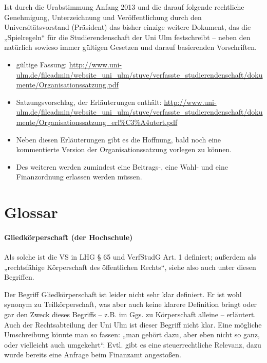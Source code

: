 \documentclass[
10pt,
a4paper,
twoside,								%
titlepage=false,							%
draft=false								%
]{scrartcl}
\begin{document}
Ist durch die Urabstimmung Anfang 2013 und die darauf folgende rechtliche Genehmigung, Unterzeichnung und Veröffentlichung durch den Universitätsvorstand (Präsident) das bisher einzige weitere Dokument, das die „Spielregeln“ für die Studierendenschaft der Uni Ulm festschreibt – neben den natürlich sowieso immer gültigen Gesetzen und darauf basierenden Vorschriften.

\begin{itemize}
	\item gültige Fassung: \sloppy  \url{http://www.uni-ulm.de/fileadmin/website_uni_ulm/stuve/verfasste_studierendenschaft/dokumente/Organisationssatzung.pdf}
	\item Satzungsvorschlag, der Erläuterungen enthält: \url{http://www.uni-ulm.de/fileadmin/website_uni_ulm/stuve/verfasste_studierendenschaft/dokumente/Organisationssatzung_erl%C3%A4utert.pdf}
	\item Neben diesen Erläuterungen gibt es die Hoffnung, bald noch eine kommentierte Version der Organisationssatzung vorlegen zu können.
	\item Des weiteren werden zumindest eine Beitrags-, eine  Wahl- und eine Finanzordnung erlassen werden müssen.
\end{itemize}


\newpage
\section{Glossar}
\label{sec:Glossar}


\paragraph{Gliedkörperschaft (der Hochschule)}

Als solche ist die VS in LHG § 65 und VerfStudG Art. 1 definiert; außerdem als „rechtsfähige Körperschaft des öffentlichen Rechts“, siehe also auch unter diesen Begriffen.

Der Begriff Gliedkörperschaft ist leider nicht sehr klar definiert. Er ist wohl synonym zu Teilkörperschaft, was aber auch keine klarere Definition bringt oder gar den Zweck dieses Begriffs – z.B. im Ggs. zu Körperschaft alleine – erläutert. Auch der Rechtsabteilung der Uni Ulm ist dieser Begriff nicht klar. Eine mögliche Umschreibung könnte man so fassen: „man gehört dazu, aber eben nicht so ganz, oder vielleicht auch umgekehrt“. Evtl. gibt es eine steuerrechtliche Relevanz, dazu wurde bereits eine Anfrage beim Finanzamt angestoßen.
\end{document}
